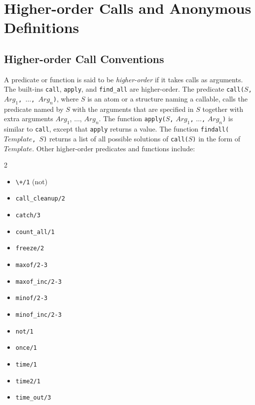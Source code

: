 \section{Higher-order Calls and Anonymous Definitions}
\label{section:overview-higher-order}
\subsection{Higher-order Call Conventions}
A predicate or function is said to be \emph{higher-order} if it takes calls as arguments. The built-ins \texttt{call}, \texttt{apply}, and \texttt{find\_all} are higher-order. The predicate \texttt{call($S$, $Arg_1$, $\ldots$, $Arg_n$)}, where $S$ is an atom or a structure naming a callable, calls the predicate named by $S$ with the arguments that are specified in $S$ together with extra arguments $Arg_1$, $\ldots$, $Arg_n$. The function \texttt{apply($S$,} \texttt{$Arg_1$,} \texttt{$\ldots$,} \texttt{$Arg_n$)} is similar to \texttt{call}, except that \texttt{apply} returns a value. The function \texttt{findall($Template$, $S$)} returns a list of all possible solutions of \texttt{call($S$)} in the form of $Template$. Other higher-order predicates and functions include:
\begin{multicols}{2}
\begin{itemize}
\item \verb-\+/1- (not)
\item \texttt{call\_cleanup/2}
\item \texttt{catch/3}
\item \texttt{count\_all/1}
\item \texttt{freeze/2}
\item \texttt{maxof/2-3}
\item \texttt{maxof\_inc/2-3}
\item \texttt{minof/2-3}
\item \texttt{minof\_inc/2-3}
\item \texttt{not/1}
\item \texttt{once/1}
\item \texttt{time/1}
\item \texttt{time2/1}
\item \texttt{time\_out/3}
\end{itemize}
\end{multicols}
